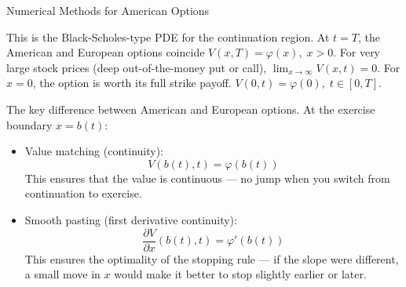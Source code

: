 \documentclass{beamer}
\begin{document}
\begin{frame}{Numerical Methods for American Options}

    {\footnotesize \footnotesize
      This is the Black-Scholes-type PDE for the continuation region. At \( t = T \), 
      the American and European options coincide $V(x, T) = \varphi(x), \; x > 0.$ 
      For very large stock prices (deep out-of-the-money put or call), $\lim_{x \to \infty} V(x, t) = 0.$
      For \( x = 0 \), the option is worth its full strike payoff. $V(0, t) = \varphi(0), \;t \in [0, T]$.
      \vspace{1em}
      
       \pause The key difference between American and European options. At the exercise boundary \( x = b(t) \):
      \begin{itemize}
        \item Value matching (continuity):\[
        V(b(t), t) = \varphi(b(t))
        \]
        This ensures that the value is continuous — no jump when you switch from continuation to exercise.
        \item  \pause Smooth pasting (first derivative continuity): \[
        \frac{\partial V}{\partial x}(b(t), t) = \varphi'(b(t))
        \]
        This ensures the optimality of the stopping rule — if the slope were different, 
        a small move in \( x \) would make it better to stop slightly earlier or later.
      \end{itemize}
    }
\end{frame}
\end{document}
